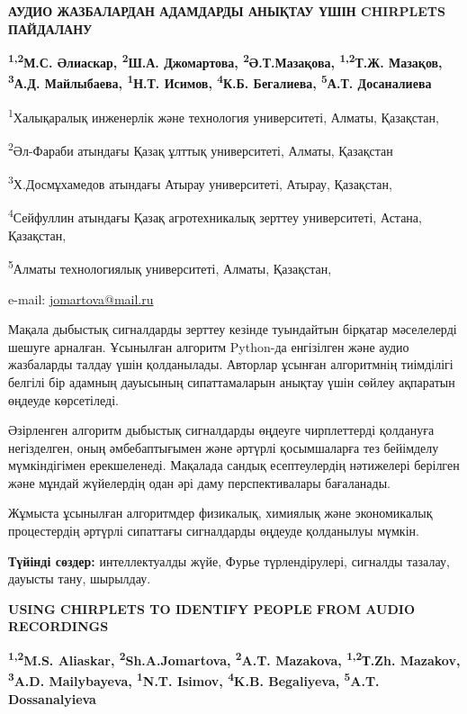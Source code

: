 \begin{articleheader}
{\bfseries АУДИО ЖАЗБАЛАРДАН АДАМДАРДЫ АНЫҚТАУ ҮШІН CHIRPLETS ПАЙДАЛАНУ}

{\bfseries
\textsuperscript{1,2}М.С. Әлиаскар,
\textsuperscript{2}Ш.А. Джомартова\textsuperscript{\envelope },
\textsuperscript{2}Ә.Т.Мазақова,
\textsuperscript{1,2}Т.Ж. Мазақов,
\textsuperscript{3}А.Д. Майлыбаева,
\textsuperscript{1}Н.Т. Исимов,
\textsuperscript{4}К.Б. Бегалиева,
\textsuperscript{5}А.Т. Досаналиева
}
\end{articleheader}

\begin{affiliation}
\textsuperscript{1}Халықаралық инженерлік және технология университеті, Алматы, Қазақстан,

\textsuperscript{2}Әл-Фараби атындағы Қазақ ұлттық университеті, Алматы, Қазақстан

\textsuperscript{3}Х.Досмұхамедов атындағы Атырау университеті, Атырау, Қазақстан,

\textsuperscript{4}Сейфуллин атындағы Қазақ агротехникалық зерттеу университеті, Астана, Қазақстан,

\textsuperscript{5}Алматы технологиялық университеті, Алматы, Қазақстан,

e-mail: \href{mailto:jomartova@mail.ru}{jomartova@mail.ru}
\end{affiliation}

Мақала дыбыстық сигналдарды зерттеу кезінде туындайтын бірқатар
мәселелерді шешуге арналған. Ұсынылған алгоритм Python-да енгізілген
және аудио жазбаларды талдау үшін қолданылады. Авторлар ұсынған
алгоритмнің тиімділігі белгілі бір адамның дауысының сипаттамаларын
анықтау үшін сөйлеу ақпаратын өңдеуде көрсетіледі.

Әзірленген алгоритм дыбыстық сигналдарды өңдеуге чирплеттерді қолдануға
негізделген, оның әмбебаптығымен және әртүрлі қосымшаларға тез бейімделу
мүмкіндігімен ерекшеленеді. Мақалада сандық есептеулердің нәтижелері
берілген және мұндай жүйелердің одан әрі даму перспективалары
бағаланады.

Жұмыста ұсынылған алгоритмдер физикалық, химиялық және экономикалық
процестердің әртүрлі сипаттағы сигналдарды өңдеуде қолданылуы мүмкін.

{\bfseries Түйінді сөздер:} интеллектуалды жүйе, Фурье түрлендірулері,
сигналды тазалау, дауысты тану, шырылдау.

\begin{articleheader}
{\bfseries USING CHIRPLETS TO IDENTIFY PEOPLE FROM AUDIO RECORDINGS}

{\bfseries
\textsuperscript{1,2}M.S. Aliaskar,
\textsuperscript{2}Sh.A.Jomartova\textsuperscript{\envelope },
\textsuperscript{2}A.T. Mazakova,
\textsuperscript{1,2}Т.Zh. Mazakov,
\textsuperscript{3}A.D. Mailybayeva,
\textsuperscript{1}N.T. Isimov,
\textsuperscript{4}K.B. Begaliyeva,
\textsuperscript{5}A.T. Dossanalyieva
}
\end{articleheader}


